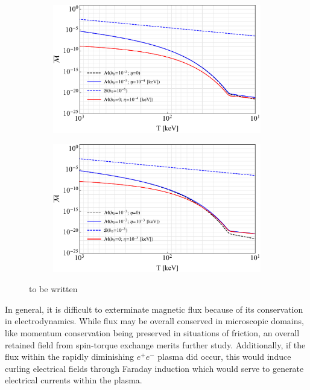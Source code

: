 \begin{figure}[ht]
    \centering
    \begin{subfigure}[b]{0.49\textwidth}
        \includegraphics[width=\textwidth]{SpinLowFugacity.pdf}
    \end{subfigure}
    \hfill
    \begin{subfigure}[b]{0.49\textwidth}
        \includegraphics[width=\textwidth]{SpinMidFugacity.pdf}
    \end{subfigure}
    \caption{to be written}
    \label{fig:spin}
\end{figure}

In general, it is difficult to exterminate magnetic flux because of its conservation in electrodynamics. While flux may be overall conserved in microscopic domains, like momentum conservation being preserved in situations of friction, an overall retained field from spin-torque exchange merits further study. Additionally, if the flux within the rapidly diminishing $e^{+}e^{-}$ plasma did occur, this would induce curling electrical fields through Faraday induction which would serve to generate electrical currents within the plasma. 
